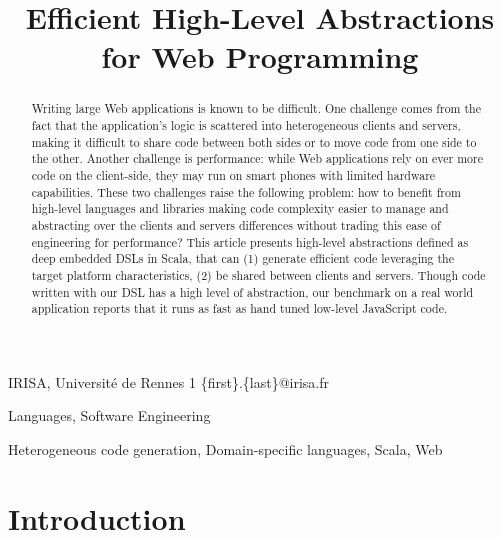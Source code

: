 \documentclass[preprint]{sigplanconf}
\begin{document}
\copyrightdata{[to be supplied]} 


\title{Efficient High-Level Abstractions for Web Programming}

           {IRISA, Université de Rennes 1}
           {\{first\}.\{last\}@irisa.fr}

\maketitle

\begin{abstract}


Writing large Web applications is known to be difficult. One challenge comes from the fact that the
application's logic is scattered into heterogeneous clients and servers, making it difficult to
share code between both sides or to move code from one side to the other. Another challenge is
performance: while Web applications rely on ever more code on the client-side, they may run on smart
phones with limited hardware capabilities. These two challenges raise the following problem: how to
benefit from high-level languages and libraries making code complexity easier to manage and
abstracting over the clients and servers differences without trading this ease of engineering for
performance? This article presents high-level abstractions defined as deep embedded DSLs in Scala,
that can (1) generate efficient code leveraging the target platform characteristics, (2) be shared
between clients and servers. Though code written with our DSL has a high level of abstraction, our
benchmark on a real world application reports that it runs as fast as hand tuned low-level
JavaScript code.
\end{abstract}


\terms Languages, Software Engineering

\keywords Heterogeneous code generation, Domain-specific languages, Scala, Web

\section{Introduction}
\end{document}
